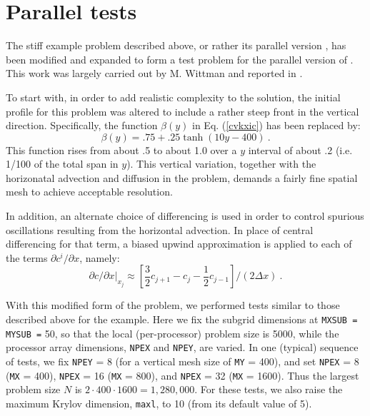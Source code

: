 \section{Parallel tests}\label{s:ex_tests}

The stiff example problem  described above, or rather its parallel
version , has been modified and expanded to form a test problem for
the parallel version of {\cvode}.  This work was largely carried out
by M. Wittman and reported in \cite{Wit:96}.

To start with, in order to add realistic complexity to the solution, the
initial profile for this problem was altered to include a rather steep front
in the vertical direction. Specifically, the function $\beta(y)$ in
Eq. (\ref{cvkxic}) has been replaced by: 
\begin{equation}
\beta(y) = .75 + .25 \tanh(10 y - 400) ~.
\end{equation}
This function rises from about .5 to about 1.0 over a $y$ interval of about
.2 (i.e. 1/100 of the total span in $y$). This vertical variation, together
with the horizonatal advection and diffusion in the problem, demands a
fairly fine spatial mesh to achieve acceptable resolution.

In addition, an alternate choice of differencing is used in order to control
spurious oscillations resulting from the horizontal advection. In place of
central differencing for that term, a biased upwind approximation is applied
to each of the terms $\partial c^i/\partial x$, namely: 
\begin{equation}
\left. \partial c/\partial x\right| _{x_j}\approx \left[ \frac
32c_{j+1}-c_j-\frac 12c_{j-1}\right] /(2\Delta x) ~.
\end{equation}

With this modified form of the problem, we performed tests similar to those
described above for the example. Here we fix the subgrid dimensions at
{\tt MXSUB = MYSUB =} 50, so that the local (per-processor) problem size is 5000,
while the processor array dimensions, {\tt NPEX} and {\tt NPEY}, are varied.
In one (typical) sequence of tests, we fix {\tt NPEY} = 8 (for a vertical
mesh size of {\tt MY} = 400), and set {\tt NPEX} = 8 ({\tt MX} = 400),
{\tt NPEX} = 16 ({\tt MX} = 800), and {\tt NPEX} = 32 ({\tt MX} = 1600). 
Thus the largest problem size $N$ is $2 \cdot 400 \cdot 1600 = 1,280,000$. 
For these tests, we also raise the maximum Krylov dimension, {\tt maxl},
to 10 (from its default value of 5).

